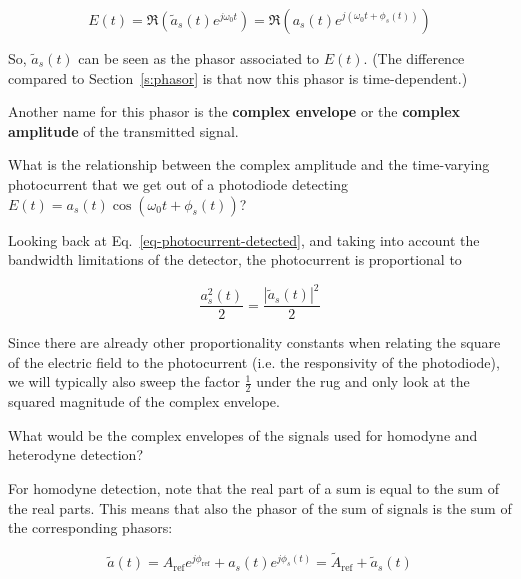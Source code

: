 \begin{equation}
E(t) = \Re \left(\tilde{a}_s(t) e^{j \omega_0 t}\right) = \Re \left(a_s(t) e^{j \left(\omega_0 t + \phi_s(t)\right)}\right)
\end{equation}

\noindent{}So, $\tilde{a}_s(t)$ can be seen as the phasor associated to $E(t)$. (The difference compared to Section~\ref{s:phasor} is that now this phasor is time-dependent.) 

Another name for this phasor is the \textbf{complex envelope} or the \textbf{complex amplitude} of the transmitted signal.

\begin{cue}
What is the relationship between the complex amplitude and the time-varying photocurrent that we get out of a photodiode detecting $ E(t) = a_s(t) \cos\left(\omega_0 t + \phi_s(t)\right) $?  
\end{cue}

Looking back at Eq.~\ref{eq-photocurrent-detected}, and taking into account the bandwidth limitations of the detector, the photocurrent is proportional to

\begin{equation}
\frac{a_s^2(t)}{2} = \frac {\left| \tilde{a}_s(t) \right|^2}{2}
\end{equation}

Since there are already other proportionality constants when relating the square of the electric field to the photocurrent (i.e. the responsivity of the photodiode), we will typically also sweep the factor $\frac{1}{2}$ under the rug and only look at the squared magnitude of the complex envelope.

\begin{cue}
What would be the complex envelopes of the signals used for homodyne and heterodyne detection?      
\end{cue}

For homodyne detection, note that the real part of a sum is equal to the sum of the real parts. This means that also the phasor of the sum of signals is the sum of the corresponding phasors:

\begin{equation}
\tilde{a}(t) = A_\mathrm{ref} e^{j \phi_\mathrm{ref}} + a_s(t) e^{j \phi_s(t)} =  \tilde{A}_\mathrm{ref} + \tilde{a}_s(t)
\end{equation}

